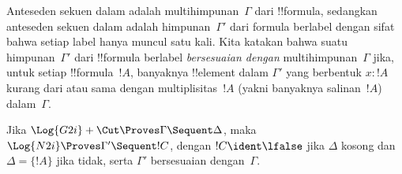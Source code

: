 \documentclass[../../../include/open-logic-section]{subfiles}
\begin{document}


Anteseden sekuen dalam  adalah multihimpunan~$\Gamma$ dari
!!{formula}, sedangkan anteseden sekuen dalam  adalah
himpunan~$\Gamma'$ dari formula berlabel dengan sifat bahwa setiap label
hanya muncul satu kali. Kita katakan bahwa suatu himpunan~$\Gamma'$ dari
!!{formula} berlabel \emph{bersesuaian dengan} multihimpunan~$\Gamma$
jika, untuk setiap !!{formula}~$!A$, banyaknya !!{element} dalam
$\Gamma'$ yang berbentuk $x:!A$ kurang dari atau sama dengan
multiplisitas~$!A$ (yakni banyaknya salinan~$!A$) dalam~$\Gamma$.

\begin{prop}
Jika $\Log{G2i}+\Cut \Proves \Gamma \Sequent \Delta$, maka
$\Log{N2i} \Proves \Gamma' \Sequent !C$, dengan
$!C\ident\lfalse$ jika $\Delta$ kosong dan
$\Delta=\{!A\}$ jika tidak, serta $\Gamma'$ bersesuaian
dengan~$\Gamma$.
\end{prop}
\end{document}
